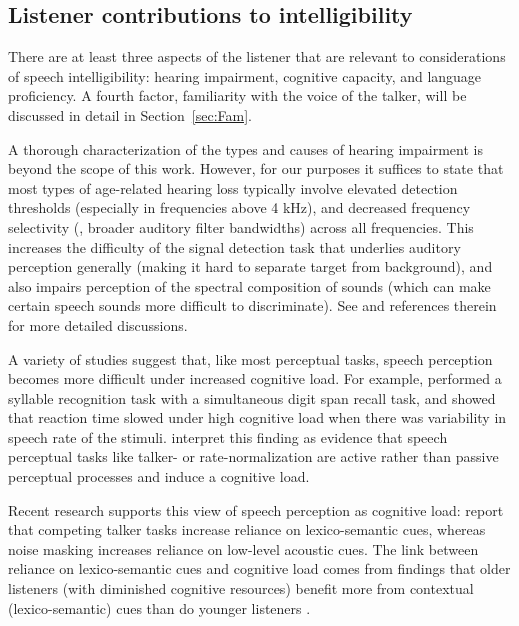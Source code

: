 \subsection{Listener contributions to intelligibility\label{sec:Listener}}
There are at least three aspects of the listener that are relevant to considerations of speech intelligibility: hearing impairment, cognitive capacity, and language proficiency.  A fourth factor, familiarity with the voice of the talker, will be discussed in detail in Section~\ref{sec:Fam}.  

A thorough characterization of the types and causes of hearing impairment is beyond the scope of this work.\footnotemark{}  However, for our purposes it suffices to state that most types of age-related hearing loss typically involve elevated detection thresholds (especially in frequencies above 4 kHz), and decreased frequency selectivity (\ie, broader auditory filter bandwidths) across all frequencies.  This increases the difficulty of the signal detection task that underlies auditory perception generally (making it hard to separate target from background), and also impairs perception of the spectral composition of sounds (which can make certain speech sounds more difficult to discriminate).  See \citet[117–119]{Moore2008} and references therein for more detailed discussions.


A variety of studies suggest that, like most perceptual tasks, speech perception becomes more difficult under increased cognitive load.  For example, \citet{FrancisNusbaum1996} performed a syllable recognition task with a simultaneous digit span recall task, and showed that reaction time slowed under high cognitive load when there was variability in speech rate of the stimuli.  \citeauthor{FrancisNusbaum1996} interpret this finding as evidence that speech perceptual tasks like talker- or rate-normalization are active rather than passive perceptual processes and induce a cognitive load.  

Recent research supports this view of speech perception as cognitive load: \citet{MattysEtAl2009} report that competing talker tasks increase reliance on lexico-semantic cues, whereas noise masking increases reliance on low-level acoustic cues.  The link between reliance on lexico-semantic cues and cognitive load comes from findings that older listeners (with diminished cognitive resources) benefit more from contextual (lexico-semantic) cues than do younger listeners \citep{PichoraFullerEtAl1995, SommersDanielson1999}.  %

